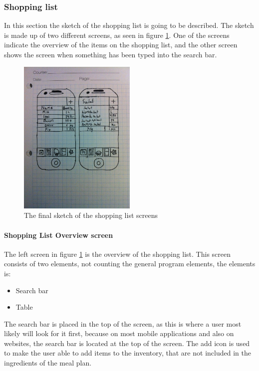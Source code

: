 \subsubsection{Shopping list} \label{ShoppingListSketches}

In this section the sketch of the shopping list is going to be described. The sketch is made up of two different screens, as seen in figure \ref{FinalShoppingListSketch}. One of the screens indicate the overview of the items on the shopping list, and the other screen shows the screen when something has been typed into the search bar.

\begin{figure}[H]
    \centering
    \includegraphics[width=0.5\textwidth]{Grafik/FoodPlanner/FinalShoppingListSketch}
    \caption{The final sketch of the shopping list screens}
    \label{FinalShoppingListSketch}
\end{figure}

\paragraph{Shopping List Overview screen}

The left screen in figure \ref{FinalShoppingListSketch} is the overview of the shopping list. This screen consists of two elements, not counting the general program elements, the elements is:

\begin{itemize}
	\item Search bar
	\item Table
\end{itemize}

The search bar is placed in the top of the screen, as this is where a user most likely will look for it first, because on most mobile applications and also on websites, the search bar is located at the top of the screen. The add icon is used to make the user able to add items to the inventory, that are not included in the ingredients of the meal plan.

